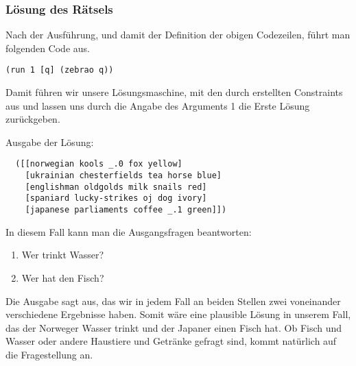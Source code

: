 \subsubsection{Lösung des Rätsels}

Nach der Ausführung, und damit der Definition der obigen Codezeilen, führt man folgenden Code aus.

\begin{lstlisting}
(run 1 [q] (zebrao q))
\end{lstlisting}

Damit führen wir unsere Lösungsmaschine, mit den durch  erstellten Constraints aus und lassen uns durch die Angabe des Arguments \dq{}1\dq{} die Erste Lösung zurückgeben.

Ausgabe der Lösung:

\begin{lstlisting}
  ([[norwegian kools _.0 fox yellow]
    [ukrainian chesterfields tea horse blue]
    [englishman oldgolds milk snails red]
    [spaniard lucky-strikes oj dog ivory]
    [japanese parliaments coffee _.1 green]])
\end{lstlisting}

In diesem Fall kann man die Ausgangsfragen beantworten:

\begin{enumerate}
  \item Wer trinkt Wasser?
  \item Wer hat den Fisch?
\end{enumerate}

Die Ausgabe sagt aus, das wir in jedem Fall an beiden Stellen zwei voneinander verschiedene Ergebnisse haben. Somit wäre eine plausible Lösung in unserem Fall, das der Norweger Wasser trinkt und der Japaner einen Fisch hat. Ob Fisch und Wasser oder andere Haustiere und Getränke gefragt sind, kommt natürlich auf die Fragestellung an.
